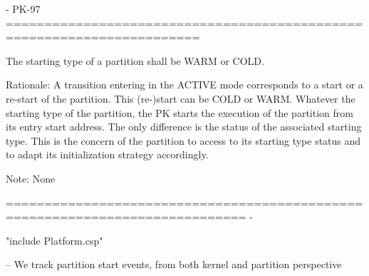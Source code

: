 {- PK-97 =======================================================================

       The starting type of a partition shall be WARM or COLD.

  Rationale: A transition entering in the ACTIVE mode corresponds to a start or
  a re-start of the partition. This (re-)start can be COLD or WARM. Whatever the
  starting type of the partition, the PK starts the execution of the partition
  from its entry start address. The only difference is the status of the
  associated starting type. This is the concern of the partition to access to
  its starting type status and to adapt its initialization strategy accordingly.

  Note: None

============================================================================= -}
\begin{assert}
"include Platform.csp"
\end{assert}
-- We track partition start events, from both kernel and partition perspective

